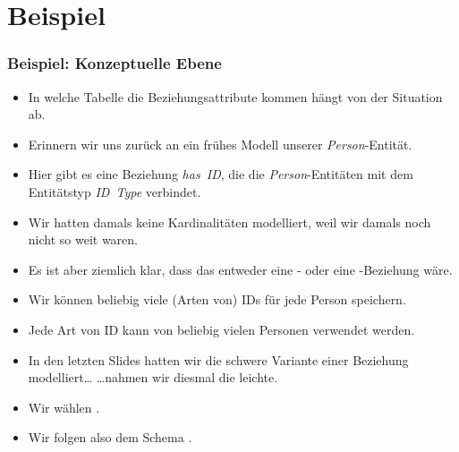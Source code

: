 \documentclass[aspectratio=169,mathserif,notheorems]{beamer}%
\begin{document}
\section{Beispiel}%
%
\begin{frame}[t]%
\frametitle{Beispiel: Konzeptuelle Ebene}%
\begin{itemize}%
%
\item In welche Tabelle die Beziehungsattribute kommen hängt von der Situation ab.%
%
\item<2-> Erinnern wir uns zurück an ein frühes Modell unserer \emph{Person}-Entität.%
%
\item<3-> Hier gibt es eine Beziehung \emph{has~ID}, die die \emph{Person}-Entitäten mit dem Entitätstyp \emph{ID~Type} verbindet.%
%
\item<4-> Wir hatten damals keine Kardinalitäten modelliert, weil wir damals noch nicht so weit waren.%
%
\item<5-> Es ist aber ziemlich klar, dass das entweder eine - oder eine -Beziehung wäre.%
%
\item<6-> Wir können beliebig viele (Arten von) IDs für jede Person speichern.%
%
\item<7-> Jede Art von ID kann von beliebig vielen Personen verwendet werden.%
%
\item<8-> In den letzten Slides hatten wir die schwere Variante einer Beziehung modelliert{\dots} {\dots}nahmen wir diesmal die leichte.%
%
\item<9-> Wir wählen .%
%
\item<10-> Wir folgen also dem Schema .%
\end{itemize}%
%
\end{frame}%
%
\end{document}
